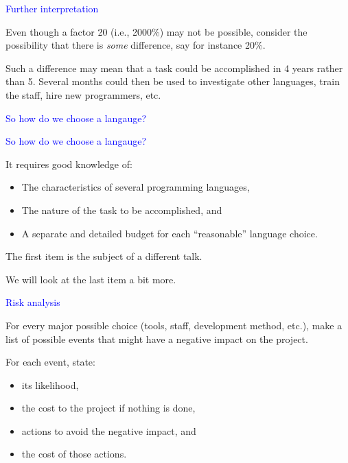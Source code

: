\documentclass{slides}
\newcommand{\ti}[1]{\begin{center}\Large{\textcolor{blue}{#1}}\end{center}}
\begin{document}
\begin{slide}\ti{Further interpretation}

Even though a factor 20 (i.e., 2000\%) may not be possible, consider
the possibility that there is \emph{some} difference, say for instance
20\%.

Such a difference may mean that a task could be accomplished in 4
years rather than 5.  Several months could then be used to investigate
other languages, train the staff, hire new programmers, etc.

\vfill\end{slide}
\begin{slide}\ti{So how do we choose a langauge?}

\vfill\end{slide}
\begin{slide}\ti{So how do we choose a langauge?}

It requires good knowledge of:

\begin{itemize}
\item The characteristics of several programming languages,
\item The nature of the task to be accomplished, and
\item A separate and detailed budget for each ``reasonable'' language
  choice.
\end{itemize}

The first item is the subject of a different talk.

We will look at the last item a bit more.

\vfill\end{slide}
\begin{slide}\ti{Risk analysis}

For every major possible choice (tools, staff, development method,
etc.), make a list of possible events that might have a negative
impact on the project.

For each event, state:

\begin{itemize}
\item its likelihood,
\item the cost to the project if nothing is done,
\item actions to avoid the negative impact, and
\item the cost of those actions.
\end{itemize}

\vfill\end{slide}
\end{document}
